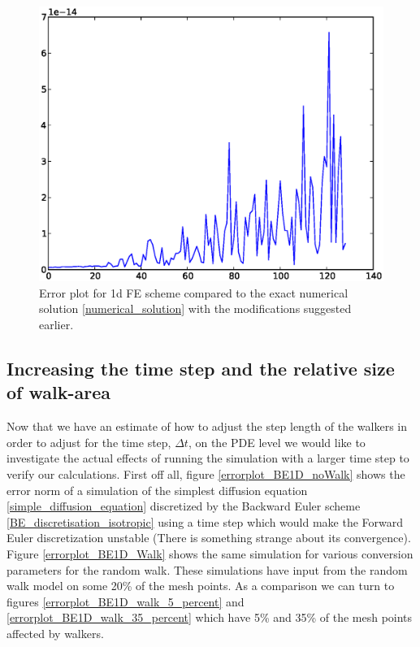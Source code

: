 \begin{figure}[H]
 \centering
 \includegraphics[scale=0.7]{Figures/exact_numerical_1d_n130.eps}
 \caption[Verification for exact numerical solution]{Error plot for 1d FE scheme compared to the exact numerical solution \ref{numerical_solution} with the modifications suggested earlier.}
 \label{errorplot_numerical_exact_FE_1D}
\end{figure}


\subsection{Increasing the time step and the relative size of walk-area}\label{increasing_dt}

Now that we have an estimate of how to adjust the step length of the walkers in order to adjust for the time step, $\Delta t$, on the PDE level we would like to investigate the actual effects of running the simulation with a larger time step to verify our calculations. 
First off all, figure \ref{errorplot_BE1D_noWalk} shows the error norm of a simulation of the simplest diffusion equation \ref{simple_diffusion_equation} discretized by the Backward Euler scheme \ref{BE_discretisation_isotropic} using a time step which would make the Forward Euler discretization unstable (There is something strange about its convergence). 
Figure \ref{errorplot_BE1D_Walk} shows the same simulation for various conversion parameters for the random walk. 
These simulations have input from the random walk model on some 20\% of the mesh points. 
As a comparison we can turn to figures \ref{errorplot_BE1D_walk_5_percent} and \ref{errorplot_BE1D_walk_35_percent} which have 5\% and 35\% of the mesh points affected by walkers.

